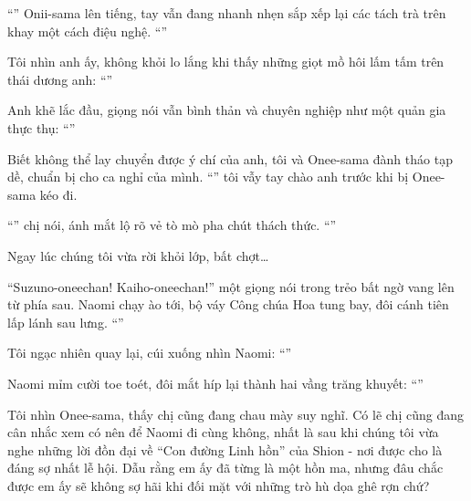 \documentclass[../main.tex]{subfiles}
\begin{document}
``'' Onii-sama lên tiếng, tay vẫn đang nhanh nhẹn sắp xếp lại các tách trà trên khay một cách điệu nghệ. ``''

Tôi nhìn anh ấy, không khỏi lo lắng khi thấy những giọt mồ hôi lấm tấm trên thái dương anh: ``''

Anh khẽ lắc đầu, giọng nói vẫn bình thản và chuyên nghiệp như một quản gia thực thụ: ``''

Biết không thể lay chuyển được ý chí của anh, tôi và Onee-sama đành tháo tạp dề, chuẩn bị cho ca nghỉ của mình. ``'' tôi vẫy tay chào anh trước khi bị Onee-sama kéo đi.

``'' chị nói, ánh mắt lộ rõ vẻ tò mò pha chút thách thức. ``''

Ngay lúc chúng tôi vừa rời khỏi lớp, bất chợt\dots

``Suzuno-oneechan! Kaiho-oneechan!'' một giọng nói trong trẻo bất ngờ vang lên từ phía sau. Naomi chạy ào tới, bộ váy Công chúa Hoa tung bay, đôi cánh tiên lấp lánh sau lưng. ``''

Tôi ngạc nhiên quay lại, cúi xuống nhìn Naomi: ``''

Naomi mỉm cười toe toét, đôi mắt híp lại thành hai vầng trăng khuyết: ``''

Tôi nhìn Onee-sama, thấy chị cũng đang chau mày suy nghĩ. Có lẽ chị cũng đang cân nhắc xem có nên để Naomi đi cùng không, nhất là sau khi chúng tôi vừa nghe những lời đồn đại về ``Con đường Linh hồn'' của Shion - nơi được cho là đáng sợ nhất lễ hội. Dẫu rằng em ấy đã từng là một hồn ma, nhưng đâu chắc được em ấy sẽ không sợ hãi khi đối mặt với những trò hù dọa ghê rợn chứ?
\end{document}
